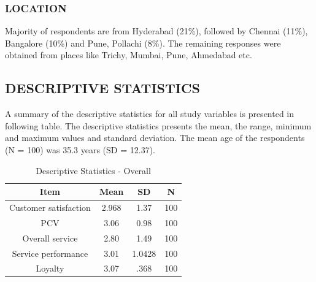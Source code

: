 \documentclass[a4paper, 12pt]{extarticle}
\begin{document}
{\subsubsection{LOCATION}
Majority of respondents are from Hyderabad (21\%), followed by Chennai (11\%), Bangalore (10\%) and Pune, Pollachi (8\%). The remaining responses were obtained from places like  Trichy, Mumbai, Pune, Ahmedabad etc.

\subsection{DESCRIPTIVE STATISTICS}
A summary of the descriptive statistics for all study variables is presented in following table. The descriptive statistics presents the mean, the range, minimum and maximum values and standard deviation. The mean age of the respondents (N = 100) was 35.3 years (SD = 12.37). 

\begin{table}[H]
\centering
\begin{tabular}{|c|c|c|c|}
\hline
Item & \textbf{Mean} & \textbf{SD} & N \\
\hline
Customer satisfaction & 2.968 & 1.37 & 100 \\
\hline
PCV & 3.06 & 0.98 & 100 \\
\hline
Overall service & 2.80 & 1.49 & 100 \\
\hline
Service performance & 3.01 & 1.0428 & 100 \\
\hline
Loyalty & 3.07 & .368 & 100 \\
\hline
\end{tabular}
\caption{Descriptive Statistics - Overall}
\end{table} 

}
\end{document}
